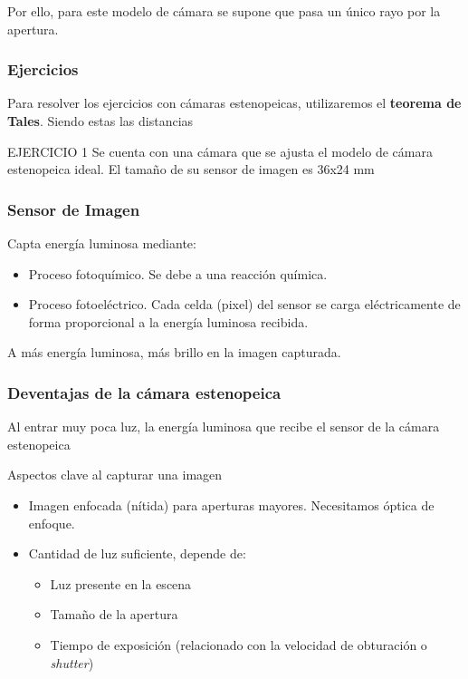 \documentclass[a4paper]{book}
\begin{document}
Por ello, para este modelo de cámara se supone que pasa un único rayo por la apertura.

\subsubsection{Ejercicios}

Para resolver los ejercicios con cámaras estenopeicas, utilizaremos el \textbf{teorema de Tales}. Siendo estas las distancias

EJERCICIO 1
Se cuenta con una cámara que se ajusta el modelo de cámara estenopeica ideal. El tamaño de su sensor de imagen es 36x24 mm

\subsubsection{Sensor de Imagen}

Capta energía luminosa mediante:
\begin{itemize}
	\item Proceso fotoquímico. Se debe a una reacción química.
	\item Proceso fotoeléctrico. Cada celda (pixel) del sensor se carga eléctricamente de forma proporcional a la energía luminosa recibida.
\end{itemize}

A más energía luminosa, más brillo en la imagen capturada.

\subsubsection{Deventajas de la cámara estenopeica}

Al entrar muy poca luz, la energía luminosa que recibe el sensor de la cámara estenopeica

Aspectos clave al capturar una imagen
\begin{itemize}
	\item Imagen enfocada (nítida) para aperturas mayores. Necesitamos óptica de enfoque.
	\item Cantidad de luz suficiente, depende de:
	      \begin{itemize}
		      \item Luz presente en la escena
		      \item Tamaño de la apertura
		      \item Tiempo de exposición (relacionado con la velocidad de obturación o \textit{shutter})
	      \end{itemize}
\end{itemize}
\end{document}

